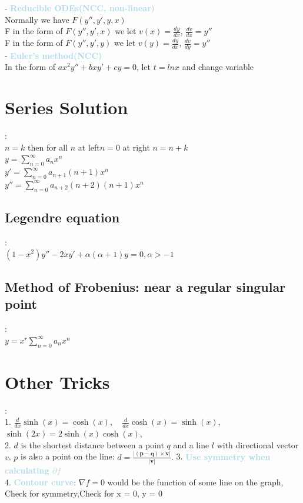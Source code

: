 \documentclass[twocolumn]{article}
\newcommand{\method}[1]{\textbf{\textcolor{lightblue}{#1}}}
\newcommand{\sectionspace}{\vspace*{1em}}
\newcommand{\properties}[1]{\textbf{\textcolor{rosered}{#1}}}
\begin{document}
- \method{Reducible ODEs(\properties{NCC, non-linear})}\\
Normally we have $F(y'', y', y, x)$\\
F in the  form of $F (y'', y', x)$ we let $v(x) = \frac{dy}{dx}$, $\frac{dv}{dx} = y''$\\
F in the  form of $F(y'', y', y)$ we let $v(y)  = \frac{dy}{dx}$, $\frac{dv}{dy} = y''$\\

- \method{Euler's method(\properties{NCC})}\\
In the form of $ax^2y''+bxy' +cy = 0$, let $t= lnx$ and change variable

\sectionspace

\section{Series Solution}
:\\
$n=k$ then for all $n$ at left$n = 0$ at right $n = n+k$\\
$y = \sum_{n=0}^{\infty} a_{n}x^{n}$\\
$y' = \sum_{n=0}^{\infty} a_{n+1}(n+1)x^{n}$\\
$y'' = \sum_{n=0}^{\infty} a_{n+2}(n+2)(n+1)x^{n}$

\subsection{Legendre equation}
:\\
$(1- x^2)y''-2xy' + \alpha (\alpha +1) y = 0, \alpha > -1$

\subsection{Method of Frobenius: near a regular singular point}
:\\
$y = x^r \sum_{n=0}^{\infty} a_{n}x^{n}$


\sectionspace

\section{Other Tricks}
:\\
1. $\frac{d}{dx} \sinh(x) = \cosh(x), \quad
\frac{d}{dx} \cosh(x) = \sinh(x)$,$ \sinh(2x)=2\sinh(x)\cosh(x)$, \\
2. $d$ is the shortest distance between a point $q$ and a line $l$ with directional vector $v$, $p$ is also a point on the line: 
$d = \frac{\lvert (\mathbf{p} - \mathbf{q}) \times \mathbf{v} \rvert}{\lvert \mathbf{v} \rvert}.$
3. \method{Use symmetry when calculating $\partial f$}\\
4. \method{Contour curve}:
$\nabla f =  0$ would be the function of some line on the graph,\\
Check for symmetry,Check for x = 0, y = 0
\end{document}
